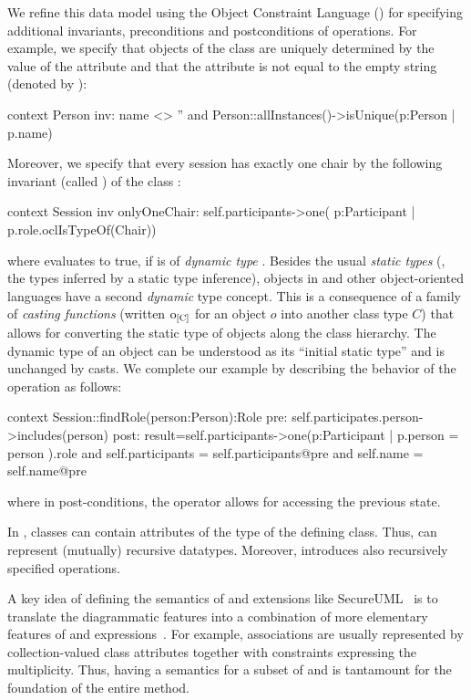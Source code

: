 We refine this data model using the Object Constraint Language (\OCL)
for specifying additional invariants, preconditions and postconditions
of operations. For example, we specify that objects of the class
 are uniquely determined by the value of the
 attribute and that the attribute  is
not equal to the empty string (denoted by ):
\begin{ocl}
context Person
  inv: name <> '' and
       Person::allInstances()->isUnique(p:Person | p.name)
\end{ocl}
Moreover, we specify that every session has exactly one chair by the
following invariant (called ) of the class
:
\begin{ocl}
context Session
  inv onlyOneChair: self.participants->one( p:Participant |
                                      p.role.oclIsTypeOf(Chair))
\end{ocl}
where  evaluates to true, if
 is of \emph{dynamic type}
. Besides the usual \emph{static types} (\ie, the
types inferred by a static type inference), objects in \UML and other
object-oriented languages have a second \emph{dynamic} type concept.
This is a consequence of a family of \emph{casting functions} (written
$\typeCast{o}{C}$ for an object $o$ into another class type $C$) that
allows for converting the static type of objects along the class
hierarchy. The dynamic type of an object can be understood as its
``initial static type'' and is unchanged by casts. We complete our
example by describing the behavior of the operation
 as follows:
\begin{ocl}
context Session::findRole(person:Person):Role
  pre:  self.participates.person->includes(person)
  post: result=self.participants->one(p:Participant |
                                p.person = person ).role
        and self.participants = self.participants@pre
        and self.name = self.name@pre
\end{ocl}
where in post-conditions, the operator  allows for
accessing the previous state.

In \UML, classes can contain attributes of the type of the
defining class.  Thus, \UML can represent (mutually) recursive
datatypes. Moreover, \OCL introduces also recursively specified
operations.

A key idea of defining the semantics of \UML and extensions like
SecureUML~\cite{brucker.ea:transformation:2006} is to translate the
diagrammatic \UML features into a combination of more elementary
features of \UML and \OCL
expressions~\cite{gogolla.ea:expressing:2001}. For example,
associations are usually represented by collection-valued class
attributes together with \OCL constraints expressing the
multiplicity. Thus, having a semantics for a subset of \UML and \OCL is
tantamount for the foundation of the entire method.




